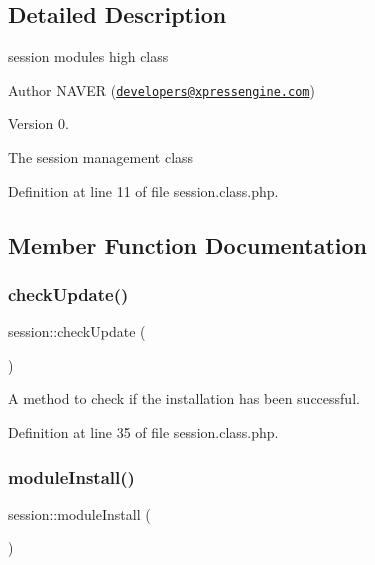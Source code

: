\subsection{Detailed Description}
session module\textquotesingle{}s high class 

\begin{DoxyAuthor}{Author}
N\+A\+V\+ER (\href{mailto:developers@xpressengine.com}{\tt developers@xpressengine.\+com}) 
\end{DoxyAuthor}
\begin{DoxyVersion}{Version}
0.
\end{DoxyVersion}
The session management class 

Definition at line 11 of file session.\+class.\+php.



\subsection{Member Function Documentation}
\mbox{\label{classsession_a30f6cc95b00bd35757aa882abce7ac34}} 
\subsubsection{\texorpdfstring{check\+Update()}{checkUpdate()}}
{\footnotesize\ttfamily session\+::check\+Update (\begin{DoxyParamCaption}{ }\end{DoxyParamCaption})}



A method to check if the installation has been successful. 



Definition at line 35 of file session.\+class.\+php.

\mbox{\label{classsession_af6b13ec50160d63aca04f689e5cac9dd}} 
\subsubsection{\texorpdfstring{module\+Install()}{moduleInstall()}}
{\footnotesize\ttfamily session\+::module\+Install (\begin{DoxyParamCaption}{ }\end{DoxyParamCaption})}



